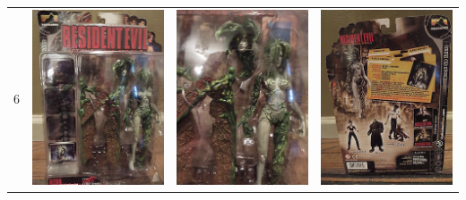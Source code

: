 \begin{longtable}{| l | l | l | l |}
	\multirow{6}{*}{6} & \includegraphics[scale=0.75]{images/ground_truth/6/image_1} & \includegraphics[scale=0.75]{images/ground_truth/6/image_2} & \includegraphics[scale=0.75]{images/ground_truth/6/image_3} \\

\end{longtable}
